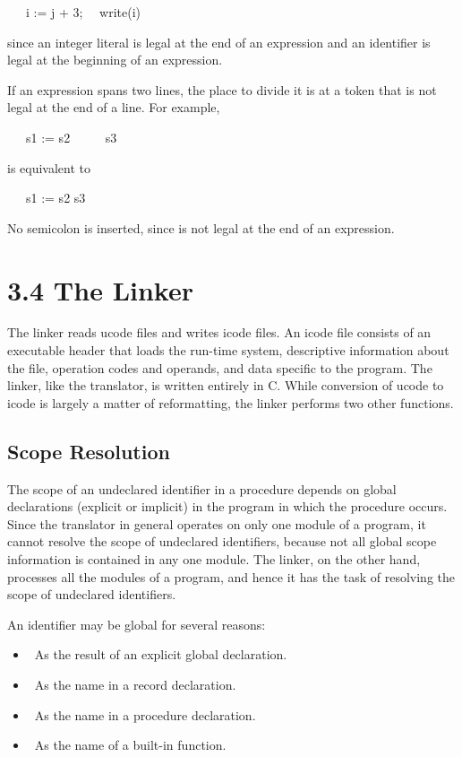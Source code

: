 {\ttfamily\mdseries
\ \ \ i := j + 3;\newline
 \ \ write(i)}

\noindent since an integer literal is legal at the end of an
expression and an identifier is legal at the beginning of an
expression.

If an expression spans two lines, the place to divide it is at a token
that is not legal at the end of a line. For example,

{\ttfamily\mdseries
\ \ \ s1 := s2 {\textbar}{\textbar}\newline
 \ \ \ \ \ s3}

\noindent is equivalent to

{\ttfamily\mdseries
\ \ \ s1 := s2 {\textbar}{\textbar} s3}

No semicolon is inserted, since \texttt{{\textbar}{\textbar}} is not
legal at the end of an expression.

\section[3.4 The Linker]{3.4 The Linker}

The linker reads ucode files and writes icode files. An icode file
consists of an executable header that loads the run-time system,
descriptive information about the file, operation codes and operands,
and data specific to the program. The linker, like the translator, is
written entirely in C. While conversion of ucode to icode is largely a
matter of reformatting, the linker performs two other functions.

\subsection{Scope Resolution}

The scope of an undeclared identifier in a procedure depends on global
declarations (explicit or implicit) in the program in which the
procedure occurs. Since the translator in general operates on only one
module of a program, it cannot resolve the scope of undeclared
identifiers, because not all global scope information is contained in
any one module. The linker, on the other hand, processes all the
modules of a program, and hence it has the task of resolving the scope
of undeclared identifiers.

An identifier may be global for several reasons:

\liststyleLii
\begin{itemize}
\item 
\ As the result of an explicit global declaration.
\item 
\ As the name in a record declaration.
\item 
\ As the name in a procedure declaration.
\item 
\ As the name of a built-in function.
\end{itemize}

